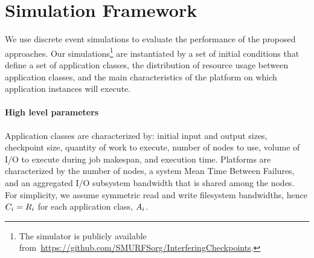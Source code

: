 
\section{Simulation Framework}
\label{sec:simulator}

We use discrete event simulations to evaluate the performance of the proposed
approaches.  Our simulations\footnote{The simulator is publicly available
from~\url{https://github.com/SMURFSorg/InterferingCheckpoints}.} are instantiated
by a set of initial conditions that define a set of application classes, the
distribution of resource usage between application classes, and the main
characteristics of the platform on which application instances will execute.

\paragraph*{High level parameters}
Application classes are characterized by: initial input and output sizes, checkpoint
size, quantity of work to execute, number of nodes to use, volume of I/O to
execute during job makespan, and execution time.
Platforms are characterized by the number of nodes, a system Mean Time
Between Failures, and an aggregated I/O subsystem bandwidth that is shared among the
nodes. For simplicity, we assume symmetric read and write filesystem bandwidths, hence
$C_{i}=R_{i}$ for each application class, $A_{i}$.

